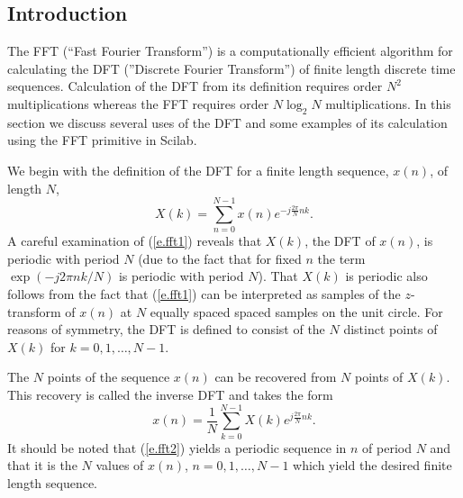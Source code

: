 \subsection{Introduction}

	The FFT (``Fast Fourier Transform'') is a computationally 
efficient algorithm for calculating the DFT (''Discrete Fourier Transform'')
of finite length discrete time sequences.
  Calculation of the DFT from its definition
requires order $N^2$ multiplications whereas the FFT requires
order $N\log_2N$ multiplications.
In this section we discuss several uses of the DFT and some examples
of its calculation using the FFT primitive in Scilab.

	We begin with the definition of the DFT
for a finite length sequence, $x(n)$, of length $N$,
%
\begin{equation}
X(k)=\sum_{n=0}^{N-1}x(n)e^{-j\frac{2\pi}{N}nk}.
\label{e.fft1}
\end{equation}
%
A careful examination of (\ref{e.fft1}) reveals that
$X(k)$, the DFT of $x(n)$, is periodic with period $N$ (due to the fact
that for fixed $n$ the term $\exp(-j2\pi nk/N)$ is periodic
with period $N$).  That $X(k)$ is periodic
also follows from the fact that (\ref{e.fft1}) can be interpreted
as samples of the $z$-transform of $x(n)$ at $N$ equally spaced
spaced samples on the unit circle.
For reasons of symmetry, the DFT is defined to consist of the $N$
distinct points of $X(k)$ for $k=0,1,\ldots,N-1$.

	The $N$ points of the sequence $x(n)$ can be recovered from
$N$ points of $X(k)$.  This recovery is called the inverse
DFT and takes the form
%
\begin{equation}
x(n)=\frac{1}{N}\sum_{k=0}^{N-1}X(k)e^{j\frac{2\pi}{N}nk}.
\label{e.fft2}
\end{equation}
%
It should be noted that (\ref{e.fft2}) yields a periodic sequence in $n$ 
of period $N$ and that it is the $N$
values of $x(n)$, $n=0,1,\ldots,N-1$ which yield
the desired finite length sequence.

